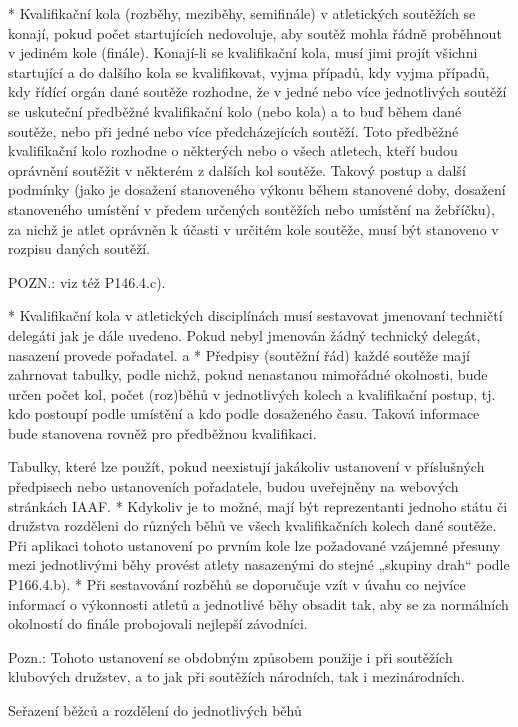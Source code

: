 * Kvalifikační kola (rozběhy, meziběhy, semifinále) v atletických soutěžích se konají, pokud počet startujících nedovoluje, aby soutěž mohla řádně proběhnout v jediném kole (finále). Konají-li se kvalifikační kola, musí jimi projít všichni startující a do dalšího kola se kvalifikovat, vyjma případů, kdy vyjma případů, kdy řídící orgán dané soutěže rozhodne, že v jedné nebo více jednotlivých soutěží se uskuteční předběžné kvalifikační kolo (nebo kola) a to buď během dané soutěže, nebo při jedné nebo více předcházejících soutěží. Toto předběžné kvalifikační kolo rozhodne o některých nebo o všech atletech, kteří budou oprávnění soutěžit v některém z dalších kol soutěže. Takový postup a další podmínky (jako je dosažení stanoveného výkonu během stanovené doby, dosažení stanoveného umístění v předem určených soutěžích nebo umístění na žebříčku), za nichž je atlet oprávněn k účasti v určitém kole soutěže, musí být stanoveno v rozpisu daných soutěží.

POZN.: viz též P146.4.c).

* Kvalifikační kola v atletických disciplínách musí sestavovat jmenovaní techničtí delegáti jak je dále uvedeno. Pokud nebyl jmenován žádný technický delegát, nasazení provede pořadatel.
  \begitems \style a
  * Předpisy (soutěžní řád) každé soutěže mají zahrnovat tabulky, podle nichž, pokud nenastanou mimořádné okolnosti, bude určen počet kol, počet (roz)běhů v jednotlivých kolech a kvalifikační postup, tj. kdo postoupí podle umístění a kdo podle dosaženého času. Taková informace bude stanovena rovněž pro předběžnou kvalifikaci.

  Tabulky, které lze použít, pokud neexistují jakákoliv ustanovení v příslušných předpisech nebo ustanoveních pořadatele, budou uveřejněny na webových stránkách IAAF.
  * Kdykoliv je to možné, mají být reprezentanti jednoho státu či družstva rozděleni do různých běhů ve všech kvalifikačních kolech dané soutěže. Při aplikaci tohoto ustanovení po prvním kole lze požadované vzájemné přesuny mezi jednotlivými běhy provést atlety nasazenými do stejné „skupiny drah“ podle P166.4.b).
  * Při sestavování rozběhů se doporučuje vzít v úvahu co nejvíce informací o výkonnosti atletů a jednotlivé běhy obsadit tak, aby se za normálních okolností do finále probojovali nejlepší závodníci.

  Pozn.: Tohoto ustanovení se obdobným způsobem použije i při soutěžích klubových družstev, a to jak při soutěžích národních, tak i mezinárodních.
  \enditems

Seřazení běžců a rozdělení do jednotlivých běhů

